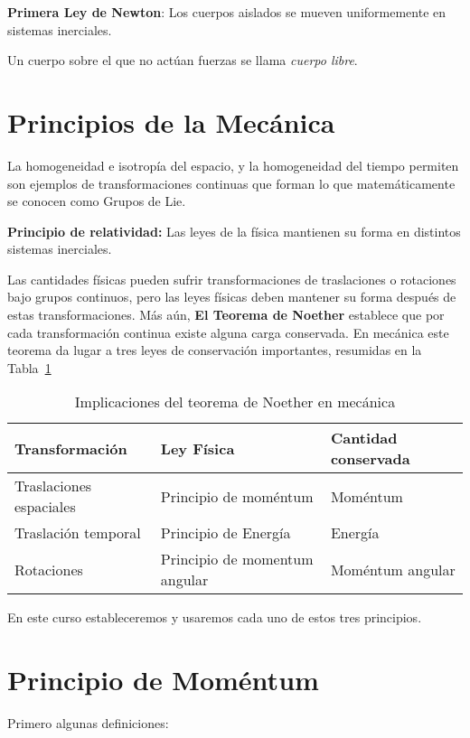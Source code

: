 \textbf{Primera Ley de Newton}: Los cuerpos aislados se mueven uniformemente en sistemas inerciales.

Un cuerpo sobre el que no act\'uan fuerzas se llama \emph{cuerpo libre}.

\section{Principios de la Mecánica}
La homogeneidad e isotropía del espacio, y la homogeneidad del tiempo permiten son ejemplos de transformaciones continuas que forman lo que matemáticamente se conocen como Grupos de Lie. 

\textbf{Principio de relatividad:} Las leyes de la física mantienen su forma en distintos sistemas inerciales.

Las cantidades físicas pueden sufrir transformaciones de traslaciones o rotaciones bajo grupos continuos, pero las leyes físicas deben mantener su forma después de estas transformaciones. Más aún, \textbf{El Teorema de Noether} establece que por cada transformación continua existe alguna carga conservada. En mecánica este teorema da lugar a tres leyes de conservación importantes, resumidas en la Tabla~\ref{tab:tn}

\begin{frame}
  
\begin{table}
  \centering
  \begin{tabular}{|l|l|l|}\hline{}
    \textbf{Transformación} &\textbf{Ley Física}  &  \textbf{Cantidad conservada}\\\hline
Traslaciones espaciales & Principio de moméntum & Moméntum\\
Traslación temporal & Principio de Energía & Energía\\
Rotaciones & Principio de momentum angular & Moméntum angular\\\hline
  \end{tabular}
  \caption{Implicaciones del teorema de Noether en mecánica}
  \label{tab:tn}
\end{table}
\end{frame}

En este curso estableceremos y usaremos cada uno de estos tres principios.

\section{Principio de Moméntum}

Primero algunas definiciones:

